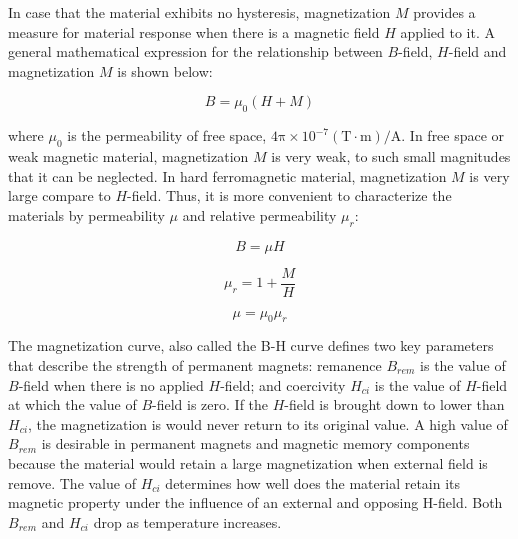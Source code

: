         
        In case that the material exhibits no hysteresis, magnetization $M$ provides a measure for material response when there is a magnetic field $H$ applied to it. A general mathematical expression for the relationship between $B$-field, $H$-field and magnetization $M$ is shown below:
    
    
        \begin{equation}
            B = \mu_0 (H + M)
            \label{eq:magnetic field, field density and magnetization}
        \end{equation}    
    
    
        where $\mu_0$ is the permeability of free space, $\mathrm{4\pi \times 10^{-7} (T\cdot m)/A}$. In free space or weak magnetic material, magnetization $M$ is very weak, to such small magnitudes that it can be neglected. In hard ferromagnetic material, magnetization $M$ is very large compare to $H$-field. Thus, it is more convenient to characterize the materials by permeability $\mu$ and relative permeability $\mu_r$:
    
    
        \begin{equation}
            B = \mu H
            \label{eq:magnetic field and magnetic field density}
        \end{equation}   
        
        \begin{equation}
            \mu_r = 1 + \frac{M}{H} 
            \label{eq:realtive permeability definition}
        \end{equation}   
        
        \begin{equation}
            \mu = \mu_0 \mu_r 
            \label{eq:permeability definition}
        \end{equation}  
    
    
        The magnetization curve, also called the B-H curve defines two key parameters that describe the strength of permanent magnets: remanence $B_{rem}$ is the value of $B$-field when there is no applied $H$-field; and coercivity $H_{ci}$ is the value of $H$-field at which the value of $B$-field is zero. If the $H$-field is brought down to lower than $H_{ci}$, the magnetization is would never return to its original value. A high value of $B_{rem}$ is desirable in permanent magnets and magnetic memory components because the material would retain a large magnetization when external field is remove. The value of $H_{ci}$ determines how well does the material retain its magnetic property under the influence of an external and opposing H-field. Both $B_{rem}$ and $H_{ci}$ drop as temperature increases.
        
